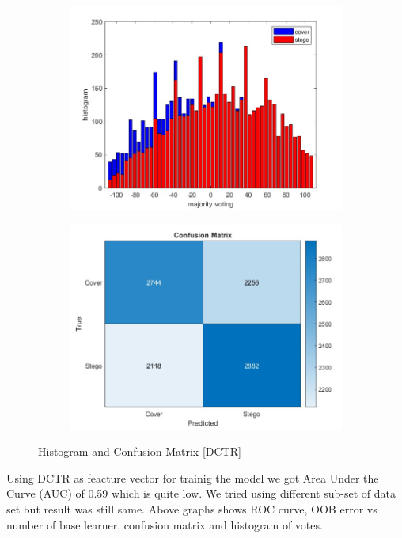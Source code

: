 \begin{figure}[H]
    \begin{subfigure}[b]{0.5\textwidth}
        \includegraphics[width=\textwidth]{img/histoDctr.jpg}
    \end{subfigure}
    \hfill
    \begin{subfigure}[b]{0.5\textwidth}
        \includegraphics[width=\textwidth]{img/confusiondctr.jpg}
    \end{subfigure}
    \caption{Histogram and Confusion Matrix [DCTR]}
\end{figure}
\begin{flushleft}
Using DCTR as feacture vector for trainig the model we got Area Under the Curve (AUC) of 0.59 which is quite low. We tried using different sub-set of data set but result was still same. Above graphs shows ROC curve, OOB error vs number of base learner, confusion matrix and histogram of votes.
\end{flushleft}
\clearpage
